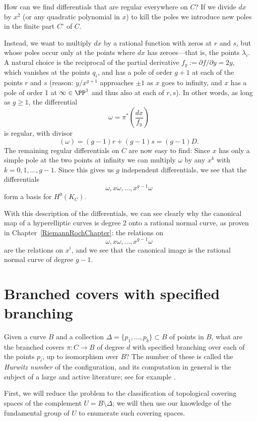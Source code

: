How can we find differentials that are regular everywhere on $C$? If we divide $dx$ by $x^2$ (or any quadratic polynomial in $x$) to kill the poles we  introduce new poles in the finite part $C^\circ$ of $C$. 

Instead, we want to multiply $dx$ by a rational function with zeros at $r$ and $s$, but whose poles occur only at the points where $dx$ has zeroes---that is, the points $\lambda_i$.  A natural choice is the reciprocal of the partial derivative $f_y := \partial f/ \partial y = 2y$, which vanishes at the points $q_i$, and has  a pole of order $g+1$ at each of the points $r$ and $s$ (reason: $y/x^{g+1}$ approaches $\pm 1$ as $x$ goes to infinity, and $x$ has a pole of order 1 at $\infty\in \PP^{1}$ and thus also at each of $r,s$). In other words, as long as $g \geq 1$, the differential
$$
\omega = \pi^*\left(\frac{dx}{f_y}\right)
$$
is regular, with divisor
$$
(\omega) = (g-1)r + (g-1)s = (g-1)D.
$$
The remaining regular differentials on $C$ are now easy to find: Since $x$ has only a simple pole
at the two points at infinity we can  multiply $\omega$ by any $x^k$ with $k = 0, 1, \dots, g-1$. Since this gives us $g$ independent differentials, we see that the differentials
$$
\omega, x\omega, \dots, x^{g-1}\omega
$$
  form a basis for $H^0(K_C)$.

With this description of the differentials, we can see clearly why the canonical map of a hyperelliptic curves is degree 2 onto a rational normal curve, as proven in Chapter~\ref{RiemannRochChapter}:
the relations on 
$$
\omega, x\omega, \dots, x^{g-1}\omega
$$
are the relations on $x^i$, and we see that the canonical image is the rational normal curve of degree $g-1$.


\section{Branched covers with specified branching}\label{branched covers}

Given a curve $B$ and a collection $\Delta = \{p_1,\dots,p_b\} \subset B$ of points in $B$, what are the branched covers $\pi : C \to B$ of degree $d$ with specified branching over each of the points $p_i$, up to isomorphism over $B$? 
The number of these is called
the \emph{Hurwitz number} of the configuration, and its computation in general is the subject of a large and active literature; see for example
\cite{ELSV}.

First, we will reduce the problem to the classification of topological covering spaces of the complement $U = B \setminus \Delta$; we will then use our knowledge of the fundamental group of $U$ to enumerate such covering spaces.
   
